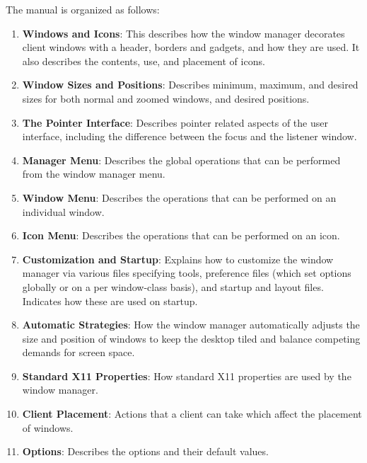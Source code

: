 The manual is organized as follows:

\begin{enumerate}
\item {\bf Windows and Icons}: This describes how the window manager decorates
client windows with a header, borders and gadgets, and how they are used.
It also describes the contents, use, and placement of icons.

\item {\bf Window Sizes and Positions}: Describes minimum, maximum, and desired
sizes for both normal and zoomed windows, and desired positions.

\item {\bf The Pointer Interface}: Describes pointer related aspects of
the user interface, including the difference between the focus and the
listener window.

\item {\bf Manager Menu}: Describes the global operations that can be performed
from the window manager menu.

\item {\bf Window Menu}: Describes the operations that can be performed on an
individual window.

\item {\bf Icon Menu}: Describes the operations that can be performed on an icon.

\item {\bf Customization and Startup}: Explains how to customize the window
manager via various files specifying tools, preference files
(which set options globally or on a per window-class basis), and startup
and layout files.  Indicates how these are used on startup.

\item {\bf Automatic Strategies}: How the window manager automatically adjusts
the size and position of windows to keep the desktop tiled and balance
competing demands for screen space.

\item {\bf Standard X11 Properties}: How standard X11 properties are used by the
window manager.

\item {\bf Client Placement}: Actions that a client can take which affect the
placement of windows.

\item {\bf Options}: Describes the options and their default values.
\end{enumerate}

